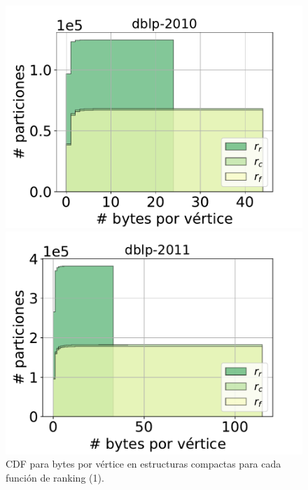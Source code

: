 \begin{frame}
\begin{figure}
    	\begin{minipage}{1\textwidth}
    		\centering
    		\begin{minipage}{0.45\textwidth}
    			\centering
    			\includegraphics[width=1\linewidth]{../img/cdf/dblp-2010.pdf}
    		\end{minipage}
    		\begin{minipage}{0.45\textwidth}
    			\centering
    			\includegraphics[width=1\linewidth]{../img/cdf/dblp-2011.pdf}
    		\end{minipage}  
    	\end{minipage}	

    \caption{CDF para bytes por vértice en estructuras compactas para cada función de ranking (1).}
\end{figure}


\end{frame}
